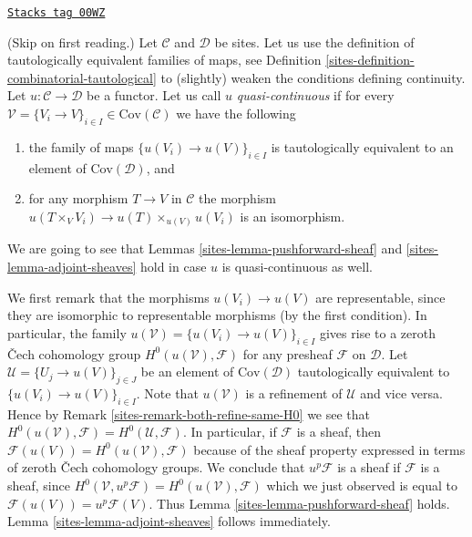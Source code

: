 \begin{remark}
\label{sites-remark-quasi-continuous}
\href{https://stacks.math.columbia.edu/tag/00WZ}{\texttt{Stacks tag 00WZ}}

(Skip on first reading.)
Let $\mathcal{C}$ and $\mathcal{D}$ be sites. Let us
use the definition of tautologically equivalent families of maps,
see Definition \ref{sites-definition-combinatorial-tautological}
to (slightly) weaken the conditions defining continuity.
Let $u : \mathcal{C} \to \mathcal{D}$ be a functor.
Let us call $u$ {\it quasi-continuous} if for every
$\mathcal{V} = \{V_i \to V\}_{i\in I} \in \text{Cov}(\mathcal{C})$
we have the following
\begin{enumerate}
\item[(1')] the family of maps
$\{u(V_i) \to u(V)\}_{i\in I}$ is tautologically equivalent
to an element of $\text{Cov}(\mathcal{D})$, and
\item[(2)] for any morphism $T \to V$ in $\mathcal{C}$ the morphism
$u(T \times_V V_i) \to u(T) \times_{u(V)} u(V_i)$ is an isomorphism.
\end{enumerate}
We are going to see that Lemmas \ref{sites-lemma-pushforward-sheaf}
and \ref{sites-lemma-adjoint-sheaves} hold in case
$u$ is quasi-continuous as well.

\medskip\noindent
We first remark that the morphisms $u(V_i) \to u(V)$ are representable, since
they are isomorphic to representable morphisms (by the first condition).
In particular, the family $u(\mathcal{V}) = \{u(V_i) \to u(V)\}_{i\in I}$
gives rise to a zeroth {\v C}ech cohomology group
$H^0(u(\mathcal{V}), \mathcal{F})$ for any presheaf $\mathcal{F}$ on
$\mathcal{D}$.
Let $\mathcal{U} = \{U_j \to u(V)\}_{j \in J}$ be an element
of $\text{Cov}(\mathcal{D})$ tautologically
equivalent to $\{u(V_i) \to u(V)\}_{i \in I}$. Note that $u(\mathcal{V})$
is a refinement of $\mathcal{U}$ and vice versa. Hence by Remark
\ref{sites-remark-both-refine-same-H0} we see that
$H^0(u(\mathcal{V}), \mathcal{F}) = H^0(\mathcal{U}, \mathcal{F})$.
In particular, if $\mathcal{F}$ is a sheaf, then
$\mathcal{F}(u(V)) = H^0(u(\mathcal{V}), \mathcal{F})$ because
of the sheaf property expressed in terms of zeroth {\v C}ech cohomology
groups. We conclude that $u^p\mathcal{F}$ is a sheaf if $\mathcal{F}$
is a sheaf, since $H^0(\mathcal{V}, u^p\mathcal{F}) =
H^0(u(\mathcal{V}), \mathcal{F})$ which we just observed is
equal to $\mathcal{F}(u(V)) = u^p\mathcal{F}(V)$. Thus Lemma
\ref{sites-lemma-pushforward-sheaf} holds. Lemma \ref{sites-lemma-adjoint-sheaves}
follows immediately.
\end{remark}

